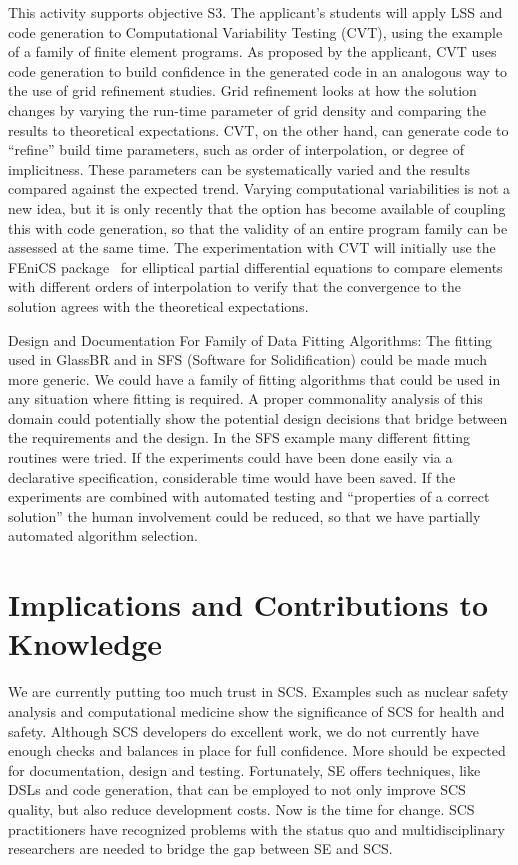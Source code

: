 \documentclass[12pt]{article}
\begin{document}
This activity supports objective S3.  The applicant's students will apply LSS
and code generation to Computational Variability Testing (CVT), using the
example of a family of finite element programs.  As proposed by the applicant,
CVT uses code generation to build confidence in the generated code in an
analogous way to the use of grid refinement studies.  Grid refinement looks at
how the solution changes by varying the run-time parameter of grid density and
comparing the results to theoretical expectations.  CVT, on the other hand, can
generate code to ``refine'' build time parameters, such as order of
interpolation, or degree of implicitness.  These parameters can be
systematically varied and the results compared against the expected trend.
Varying computational variabilities is not a new idea, but it is only recently
that the option has become available of coupling this with code generation, so
that the validity of an entire program family can be assessed at the same time.
The experimentation with CVT will initially use the FEniCS
package~\citep{LoggEtAl2012} for elliptical partial differential equations to
compare elements with different orders of interpolation to verify that the
convergence to the solution agrees with the theoretical expectations.

{Design and Documentation For Family of Data Fitting Algorithms}: The fitting
used in GlassBR and in SFS (Software for Solidification) could be made much more
generic.  We could have a family of fitting algorithms that could be used in any
situation where fitting is required.  A proper commonality analysis of this
domain could potentially show the potential design decisions that bridge between
the requirements and the design.  In the SFS example many different fitting
routines were tried.  If the experiments could have been done easily via a
declarative specification, considerable time would have been saved.  If the
experiments are combined with automated testing and ``properties of a correct
solution'' the human involvement could be reduced, so that we have partially
automated algorithm selection.

\section{Implications and Contributions to Knowledge} \label{SecContribKnowledge}

We are currently putting too much trust in SCS.  Examples such as nuclear safety
analysis and computational medicine show the significance of SCS for health and
safety.  Although SCS developers do excellent work, we do not currently have
enough checks and balances in place for full confidence.  More should be
expected for documentation, design and testing.  Fortunately, SE offers
techniques, like DSLs and code generation, that can be employed to not only
improve SCS quality, but also reduce development costs.  Now is the time for
change.  SCS practitioners have recognized problems with the status quo and
multidisciplinary researchers are needed to bridge the gap between SE and SCS.
\end{document}
